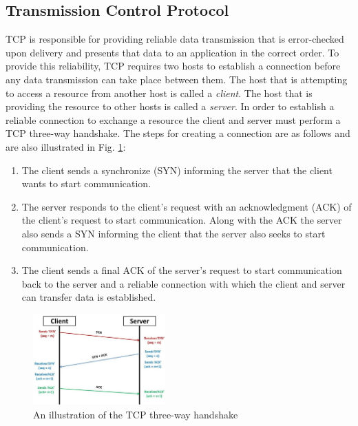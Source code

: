 \documentclass[sigplan,screen,nonacm]{acmart}
\begin{document}
\subsection{Transmission Control Protocol}
\label{sec:tcp}
TCP is responsible for providing reliable data transmission that is error-checked upon delivery and presents that data to an application in the correct order. To provide this reliability, TCP requires two hosts to establish a connection before any data transmission can take place between them. The host that is attempting to access a resource from another host is called a \emph{client}. The host that is providing the resource to other hosts is called a \emph{server}. In order to establish a reliable connection to exchange a resource the client and server must perform a TCP three-way handshake. The steps for creating a connection are as follows and are also illustrated in Fig. \ref{fig:handshake}:
\begin{enumerate}
  \item The client sends a synchronize (SYN) informing the server that the client wants to start communication.
  \item The server responds to the client's request with an acknowledgment (ACK) of the client's request to start communication. Along with the ACK the server also sends a SYN informing the client that the server also seeks to start communication.
  \item The client sends a final ACK of the server’s request to start communication back to the server and a reliable connection with which the client and server can transfer data is established.
\end{enumerate}

\begin{figure}
\includegraphics[width=2in]{mptcp_paper/assets/tcp-3-way-handshake.jpg}
\caption{An illustration of the TCP three-way handshake}
\label{fig:handshake}
\end{figure}
\end{document}
